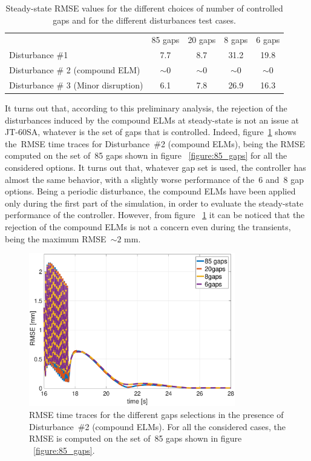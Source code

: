 \begin{table}[h]
	\centering
	\begin{tabular}{|l|c|c|c|c|}
		\hline
		\rowcolor{color2}
		\multicolumn{5}{|c|}{\textbf{Steady-state RMSE  mm}}                        \\ \hline
		\rowcolor{color1}
		\multicolumn{1}{|c|}{}              & 85 gaps & 20 gaps & 8 gaps  & 6 gaps  \\ \hline
		Disturbance \#1                     & 7.7     & 8.7     & 31.2    & 19.8    \\ \hline
		Disturbance \# 2 (compound ELM)      & $\sim 0$ & $\sim 0$ & $\sim 0$ & $\sim 0$ \\ \hline
		Disturbance \# 3 (Minor disruption) & 6.1     & 7.8     & 26.9    & 16.3    \\ \hline
	\end{tabular}
	\caption{Steady-state RMSE values for the different choices of number of controlled gaps and for the different disturbances test cases. }
	\label{gapTable}
\end{table}


It turns out that, according to this preliminary analysis, the rejection of the disturbances induced by the compound ELMs at steady-state is not an issue at JT-60SA, whatever is the set of gaps that is controlled. Indeed, figure~\ref{figure:RMSE_ELM} shows the~RMSE time traces for Disturbance~\#2 (compound ELMs), being the RMSE computed on the set of~85 gaps shown in figure ~\ref{figure:85_gaps} for all the considered options. It turns out that, whatever gap set is used, the controller has almost the same behavior, with a slightly worse performance of the~6 and~8 gap options. Being a periodic disturbance, the compound ELMs have been applied only during the first part of the simulation, in order to evaluate the steady-state performance of the controller. However, from figure ~\ref{figure:RMSE_ELM} it can be noticed that the rejection of the compound ELMs is not a concern even during the transients, being the maximum RMSE~$\sim 2$ mm. \smallskip

\begin{figure}[!thb]
	\begin{center}
		\includegraphics[width=9cm]{Chp3/RMSE_ELM.eps}
	\end{center}\caption{RMSE time traces for the different gaps selections in the presence of Disturbance~\#2 (compound ELMs). For all the considered cases, the RMSE is computed on the set of~85 gaps shown in figure ~\ref{figure:85_gaps}.}\label{figure:RMSE_ELM}
\end{figure}




